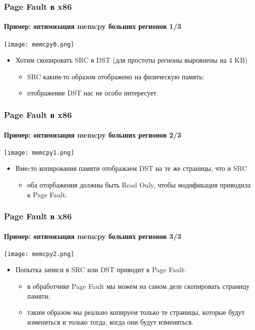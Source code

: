 \begin{frame}
\frametitle{Page Fault в x86}
\framesubtitle{Пример: оптимизация memcpy больших регионов 1/3}
\begin{center}
  \texttt{[image: memcpy0.png]}
\end{center}
\begin{itemize}
  \item Хотим скопировать SRC в DST (для простоты регионы выровнены на 4 KB)
  \begin{itemize}
    \item SRC каким-то образом отображено на физическую память;
    \item отображение DST нас не особо интересует.
  \end{itemize}
\end{itemize}
\end{frame}

\begin{frame}
\frametitle{Page Fault в x86}
\framesubtitle{Пример: оптимизация memcpy больших регионов 2/3}
\begin{center}
  \texttt{[image: memcpy1.png]}
\end{center}
\begin{itemize}
  \item Вмеcто копирования памяти отображаем DST на те же страницы, что и SRC
  \begin{itemize}
    \item оба оторбажения должны быть Read Only, чтобы модификация приводила к
    Page Fault.
  \end{itemize}
\end{itemize}
\end{frame}

\begin{frame}
\frametitle{Page Fault в x86}
\framesubtitle{Пример: оптимизация memcpy больших регионов 3/3}
\begin{center}
  \texttt{[image: memcpy2.png]}
\end{center}
\begin{itemize}
  \item Попытка записи в SRC или DST приводит к Page Fault:
  \begin{itemize}
    \item в обработчике Page Fault мы можем на самом деле скопировать страницу
    памяти;
    \item таким образом мы реально копируем только те страницы, которые будут
    изменяться и только тогда, когда они будут изменяться.
  \end{itemize}
\end{itemize}
\end{frame}

